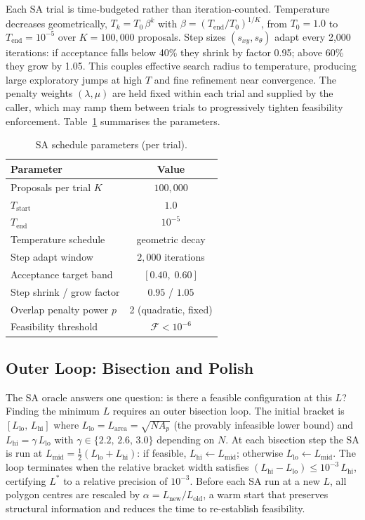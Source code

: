 \documentclass[10pt,twocolumn]{article}
\begin{document}
Each SA trial is time-budgeted rather than iteration-counted.
Temperature decreases geometrically,
$T_k = T_0\,\beta^k$ with $\beta = (T_{\mathrm{end}}/T_0)^{1/K}$,
from $T_0 = 1.0$ to $T_{\mathrm{end}} = 10^{-5}$ over $K = 100{,}000$
proposals. Step sizes $(s_{xy}, s_\theta)$ adapt every 2{,}000
iterations: if acceptance falls below 40\% they shrink by factor
0.95; above 60\% they grow by 1.05. This couples effective search
radius to temperature, producing large exploratory jumps at high $T$
and fine refinement near convergence. The penalty weights
$(\lambda, \mu)$ are held fixed within each trial and supplied by
the caller, which may ramp them between trials to progressively
tighten feasibility enforcement. Table~\ref{tab:sa} summarises the
parameters.

\begin{table}[t]
\centering\small
\setlength{\tabcolsep}{4.5pt}
\caption{SA schedule parameters (per trial).}
\label{tab:sa}
\begin{tabular}{lc}
\toprule
Parameter & Value \\
\midrule
Proposals per trial $K$   & $100{,}000$ \\
$T_{\mathrm{start}}$      & $1.0$ \\
$T_{\mathrm{end}}$        & $10^{-5}$ \\
Temperature schedule      & geometric decay \\
Step adapt window         & $2{,}000$ iterations \\
Acceptance target band    & $[0.40,\;0.60]$ \\
Step shrink / grow factor & $0.95$ / $1.05$ \\
Overlap penalty power $p$ & 2 (quadratic, fixed) \\
Feasibility threshold     & $\mathcal{F} < 10^{-6}$ \\
\bottomrule
\end{tabular}
\end{table}

\subsection{Outer Loop: Bisection and Polish}

The SA oracle answers one question: is there a feasible configuration
at this $L$? Finding the minimum $L$ requires an outer bisection loop.
The initial bracket is $[L_{\mathrm{lo}},\, L_{\mathrm{hi}}]$ where
$L_{\mathrm{lo}} = L_{\mathrm{area}} = \sqrt{N A_p}$ (the provably
infeasible lower bound) and $L_{\mathrm{hi}} = \gamma\,L_{\mathrm{lo}}$
with $\gamma \in \{2.2,\, 2.6,\, 3.0\}$ depending on $N$. At each
bisection step the SA is run at $L_{\mathrm{mid}} = \tfrac{1}{2}(
L_{\mathrm{lo}} + L_{\mathrm{hi}})$: if feasible, $L_{\mathrm{hi}}
\leftarrow L_{\mathrm{mid}}$; otherwise $L_{\mathrm{lo}} \leftarrow
L_{\mathrm{mid}}$. The loop terminates when the relative bracket width
satisfies $(L_{\mathrm{hi}} - L_{\mathrm{lo}}) \leq 10^{-3}\,
L_{\mathrm{hi}}$, certifying $L^*$ to a relative precision of
$10^{-3}$. Before each SA run at a new $L$, all polygon centres are
rescaled by $\alpha = L_{\mathrm{new}}/L_{\mathrm{old}}$, a warm
start that preserves structural information and reduces the time to
re-establish feasibility.
\end{document}
